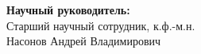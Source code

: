 \begin{titlepage}
\vfill
\begin{flushright}
\large 
\textbf{Научный руководитель:}\\
Старший научный сотрудник, к.ф.-м.н.\\
Насонов Андрей Владимирович
\end{flushright}
 

\vfill %

\end{titlepage}%
